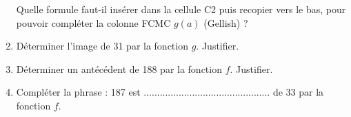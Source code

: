 \begin{enumerate}
Quelle formule faut-il insérer dans la cellule C2 puis recopier vers le bas, pour pouvoir compléter la colonne \og FCMC $g(a)$ (Gellish) \fg ?

\item Déterminer l'image de 31 par la fonction $g$. Justifier.
\item Déterminer un antécédent de 188 par la fonction $f$. Justifier.
\item Compléter la phrase :  187 est ............................................... de 33 par la fonction $f$. 
\end{enumerate}